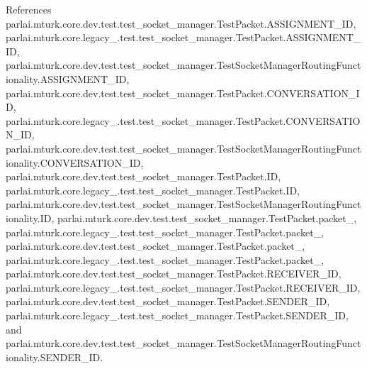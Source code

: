 References parlai.\+mturk.\+core.\+dev.\+test.\+test\+\_\+socket\+\_\+manager.\+Test\+Packet.\+A\+S\+S\+I\+G\+N\+M\+E\+N\+T\+\_\+\+ID, parlai.\+mturk.\+core.\+legacy\+\_.\+test.\+test\+\_\+socket\+\_\+manager.\+Test\+Packet.\+A\+S\+S\+I\+G\+N\+M\+E\+N\+T\+\_\+\+ID, parlai.\+mturk.\+core.\+dev.\+test.\+test\+\_\+socket\+\_\+manager.\+Test\+Socket\+Manager\+Routing\+Functionality.\+A\+S\+S\+I\+G\+N\+M\+E\+N\+T\+\_\+\+ID, parlai.\+mturk.\+core.\+dev.\+test.\+test\+\_\+socket\+\_\+manager.\+Test\+Packet.\+C\+O\+N\+V\+E\+R\+S\+A\+T\+I\+O\+N\+\_\+\+ID, parlai.\+mturk.\+core.\+legacy\+\_.\+test.\+test\+\_\+socket\+\_\+manager.\+Test\+Packet.\+C\+O\+N\+V\+E\+R\+S\+A\+T\+I\+O\+N\+\_\+\+ID, parlai.\+mturk.\+core.\+dev.\+test.\+test\+\_\+socket\+\_\+manager.\+Test\+Socket\+Manager\+Routing\+Functionality.\+C\+O\+N\+V\+E\+R\+S\+A\+T\+I\+O\+N\+\_\+\+ID, parlai.\+mturk.\+core.\+dev.\+test.\+test\+\_\+socket\+\_\+manager.\+Test\+Packet.\+ID, parlai.\+mturk.\+core.\+legacy\+\_.\+test.\+test\+\_\+socket\+\_\+manager.\+Test\+Packet.\+ID, parlai.\+mturk.\+core.\+dev.\+test.\+test\+\_\+socket\+\_\+manager.\+Test\+Socket\+Manager\+Routing\+Functionality.\+ID, parlai.\+mturk.\+core.\+dev.\+test.\+test\+\_\+socket\+\_\+manager.\+Test\+Packet.\+packet\+\_, parlai.\+mturk.\+core.\+legacy\+\_.\+test.\+test\+\_\+socket\+\_\+manager.\+Test\+Packet.\+packet\+\_, parlai.\+mturk.\+core.\+dev.\+test.\+test\+\_\+socket\+\_\+manager.\+Test\+Packet.\+packet\+\_, parlai.\+mturk.\+core.\+legacy\+\_.\+test.\+test\+\_\+socket\+\_\+manager.\+Test\+Packet.\+packet\+\_, parlai.\+mturk.\+core.\+dev.\+test.\+test\+\_\+socket\+\_\+manager.\+Test\+Packet.\+R\+E\+C\+E\+I\+V\+E\+R\+\_\+\+ID, parlai.\+mturk.\+core.\+legacy\+\_.\+test.\+test\+\_\+socket\+\_\+manager.\+Test\+Packet.\+R\+E\+C\+E\+I\+V\+E\+R\+\_\+\+ID, parlai.\+mturk.\+core.\+dev.\+test.\+test\+\_\+socket\+\_\+manager.\+Test\+Packet.\+S\+E\+N\+D\+E\+R\+\_\+\+ID, parlai.\+mturk.\+core.\+legacy\+\_.\+test.\+test\+\_\+socket\+\_\+manager.\+Test\+Packet.\+S\+E\+N\+D\+E\+R\+\_\+\+ID, and parlai.\+mturk.\+core.\+dev.\+test.\+test\+\_\+socket\+\_\+manager.\+Test\+Socket\+Manager\+Routing\+Functionality.\+S\+E\+N\+D\+E\+R\+\_\+\+ID.

\mbox{\label{classparlai_1_1mturk_1_1core_1_1legacy__2018_1_1test_1_1test__socket__manager_1_1TestPacket_ad9695218e4d54305abd21e8666457d9b}} 
